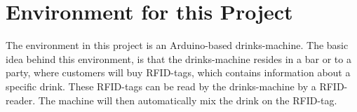 \section{Environment for this Project}
The environment in this project is an Arduino-based drinks-machine. The basic idea behind this environment, is that the drinks-machine resides in a bar or to a party, where customers will buy RFID-tags, which contains information about a specific drink. These RFID-tags can be read by the drinks-machine by a RFID-reader. The machine will then automatically mix the drink on the RFID-tag.